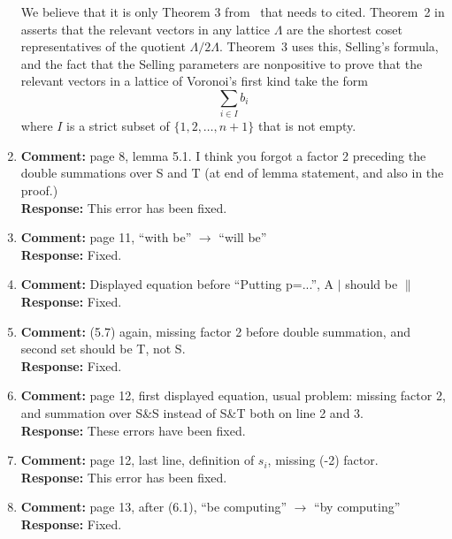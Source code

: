 \documentclass[a4paper,10pt]{article}
\begin{document}
\begin{enumerate}
We believe that it is only Theorem 3 from~\cite{ConwaySloane1992_voronoi_lattice_3d_obtuse_superbases} that needs to cited.  Theorem~2 in \cite{ConwaySloane1992_voronoi_lattice_3d_obtuse_superbases} asserts that the relevant vectors in any lattice $\Lambda$ are the shortest coset representatives of the quotient $\Lambda/2\Lambda$.  Theorem~3 uses this, Selling's formula, and the fact that the Selling parameters are nonpositive to prove that the relevant vectors in a lattice of Voronoi's first kind take the form
\[
\sum_{i \in I} b_i
\]
where $I$ is a strict subset of $\{1, 2, \dots, n+1\}$ that is not empty.


\item\textbf{Comment:}  
page 8, lemma 5.1. I think you forgot a factor 2 preceding the double summations over S and T (at end of lemma statement, and also in the proof.) 
\\\textbf{Response:}
This error has been fixed.

\item\textbf{Comment:}  
page 11, ``with be'' $\to$ ``will be'' 
\\\textbf{Response:}
Fixed.

\item\textbf{Comment:}  
Displayed equation before ``Putting p=...'', A $|$ should be $\|$
\\\textbf{Response:}
Fixed.

\item\textbf{Comment:}  
(5.7) again, missing factor 2 before double summation, and second set should be T, not S. 
\\\textbf{Response:}
Fixed.

\item\textbf{Comment:}  
page 12, first displayed equation, usual problem: missing factor 2, and summation over S\&S instead of S\&T both on line 2 and 3. 
\\\textbf{Response:}
These errors have been fixed.

\item\textbf{Comment:}  
page 12, last line, definition of $s_i$, missing (-2) factor. 
\\\textbf{Response:}
This error has been fixed.

\item\textbf{Comment:}  
page 13, after (6.1), ``be computing'' $\to$ ``by computing'' 
\\\textbf{Response:}
Fixed.


\end{enumerate}
\end{document}
